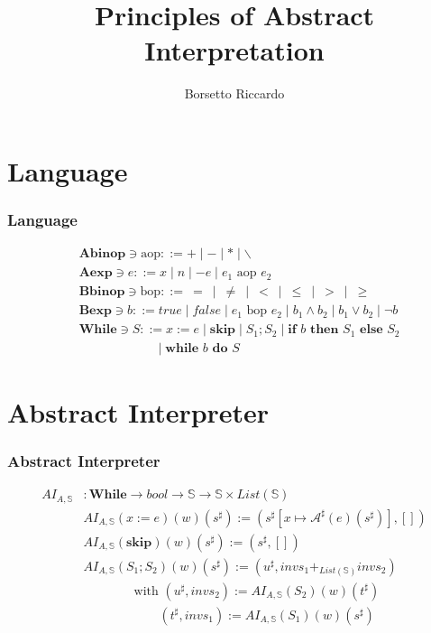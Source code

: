 \documentclass[aspectratio=169]{beamer}
\title{Principles of Abstract Interpretation}
\author{Borsetto Riccardo}
\institute{Università degli studi di Verona}
\begin{document}
\frame{\titlepage}


\section{Language}

\begin{frame}
    \frametitle{Language}
        \begin{align*}
        &\mathbf { Abinop } \ni \text{aop}::= + \mid - \mid * \mid \backslash  \\
        &\mathbf { Aexp } \ni e::= x \mid n \mid -e \mid e_1 \text { aop } e_2 \\
        &\mathbf { Bbinop } \ni \text{bop}::= \ =\ \mid\ \ne\ \mid\ <\ \mid\ \le\ \mid\ > \ \mid\ \ge\\
        & \mathbf { Bexp } \ni b::=  true  \mid false \mid e_1 \text{ bop } e_2 \mid b_1 \wedge b_2 \mid b_1 \vee b_2 \mid \neg b \\
        & \mathbf { While } \ni S::= x:=e \mid \textbf {skip} \mid S_1 ; S_2 \mid \textbf {if } b \textbf { then } S_1 \textbf { else } S_2\\
         &\qquad \qquad \qquad \mid \textbf {while } b \textbf { do } S
        \end{align*}
\end{frame}

\section{Abstract Interpreter}

\begin{frame}
    \frametitle{Abstract Interpreter}
\begin{align*}
AI_{A, \mathbb{S}}&: \mathbf { While } \to bool \rightarrow \mathbb{S} \rightarrow \mathbb{S} \times List(\mathbb{S}) \\
&AI_{A, \mathbb{S}} (x:=e) (w) (s^{\sharp}) := (s^{\sharp}[x \mapsto \mathcal{A}^{\sharp} (e) (s^{\sharp})], []) \\
&AI_{A, \mathbb{S}} (\textbf{skip}) (w) (s^{\sharp}) := (s^{\sharp}, []) \\
&AI_{A, \mathbb{S}} (S_1 ; S_2) (w) (s^{\sharp}) := (u^{\sharp}, invs_1 +_{List(\mathbb{S})} invs_2) \\
& \qquad \qquad \text{with } (u^{\sharp}, invs_2) := AI_{A, \mathbb{S}} (S_2) (w) (t^{\sharp}) \\
& \qquad \qquad \qquad (t^{\sharp}, invs_1) := AI_{A, \mathbb{S}} (S_1) (w) (s^{\sharp})
\end{align*}
\end{frame}
\end{document}
